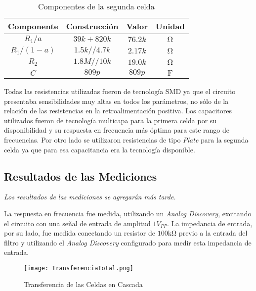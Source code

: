 \begin{table}[ht]
\begin{center}
\begin{tabular}{||c|c|c|c||}
\hline
Componente	&	Construcción	&	Valor	&	Unidad	\\
\hline
$R_1/a$	&	$39k + 820 k$	&	$76.2 k$	&	$\si{\ohm}$	\\
$R_1/(1-a)$	&	$1.5k // 4.7 k$	&	$2.17 k$	&	$\si{\ohm}$	\\
$R_2$ &	$1.8 M // 10 k$	&$19.0k$&	$\si{\ohm}$	\\
$C$	&	$809 p$	&	$809 p$	&	$\si{\farad}$	\\
\hline
\end{tabular}
\caption{Componentes de la segunda celda}
\label{tab:e2 comp cell 2}
\end{center}
\end{table}

Todas las resistencias utilizadas fueron de tecnología SMD ya que el circuito presentaba sensibilidades muy altas en todos los parámetros, no sólo de la relación de las resistencias en la retroalimentación positiva. Los capacitores utilizados fueron de tecnología multicapa para la primera celda por su disponibilidad y su respuesta en frecuencia más óptima para este rango de frecuencias. Por otro lado se utilizaron resistencias de tipo \textit{Plate} para la segunda celda ya que para esa capacitancia era la tecnología disponible.

\subsection{Resultados de las Mediciones}

\textit{Los resultados de las mediciones se agregarán más tarde.}

La respuesta en frecuencia fue medida, utilizando un \textit{Analog Discovery}, excitando el circuito con una señal de entrada de amplitud $1 V_{PP}$. La impedancia de entrada, por su lado, fue medida conectando un resistor de $100 \si{\kilo\ohm}$ previo a la entrada del filtro y utilizando el \textit{Analog Discovery} configurado para medir esta impedancia de entrada.

\begin{figure}[ht]
\begin{center}
\texttt{[image: TransferenciaTotal.png]}
\caption{Transferencia de las Celdas en Cascada}
\label{fig:e2 H total}
\end{center}
\end{figure}

